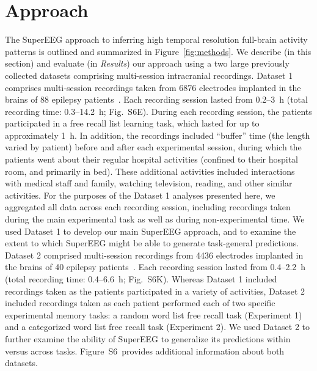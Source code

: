 \documentclass[11pt]{article}
\newcommand{\suppstats}{S6}
\begin{document}
\section*{Approach}
The SuperEEG approach to inferring high temporal resolution full-brain
activity patterns is outlined and summarized in
Figure~\ref{fig:methods}. We describe (in this section) and evaluate
(in \textit{Results}) our approach using a two large previously
collected datasets comprising multi-session intracranial recordings.
Dataset 1 comprises multi-session recordings taken from 6876
electrodes implanted in the brains of 88 epilepsy
patients~\citep{SedeEtal03, SedeEtal07a, SedeEtal07b, MannEtal11,
  MannEtal12}.  Each recording session lasted from 0.2--3~h (total
recording time: 0.3--14.2~h; Fig.~\suppstats E).  During each
recording session, the patients participated in a free recall list
learning task, which lasted for up to approximately 1~h.  In addition,
the recordings included ``buffer'' time (the length varied by patient)
before and after each experimental session, during which the patients
went about their regular hospital activities (confined to their
hospital room, and primarily in bed).  These additional activities
included interactions with medical staff and family, watching
television, reading, and other similar activities.  For the purposes
of the Dataset 1 analyses presented here, we aggregated all data
across each recording session, including recordings taken during the
main experimental task as well as during non-experimental time.  We
used Dataset 1 to develop our main SuperEEG approach, and to examine
the extent to which SuperEEG might be able to generate task-general
predictions.  Dataset 2 comprised multi-session recordings from 4436
electrodes implanted in the brains of 40 epilepsy
patients~\citep{EzzyEtal17, HoraEtal17, KragEtal17, KuceEtal17,
  LinEtal17, SoloEtal18, WeidEtal18, EzzyEtal18, KuceEtal18}.  Each
recording session lasted from 0.4--2.2~h (total recording time:
0.4--6.6~h; Fig.~\suppstats K).  Whereas Dataset 1 included recordings
taken as the patients participated in a variety of activities, Dataset
2 included recordings taken as each patient performed each of two
specific experimental memory tasks: a random word list free recall
task (Experiment 1) and a categorized word list free recall task
(Experiment 2).  We used Dataset 2
to further examine the ability of SuperEEG to generalize its
predictions within versus across tasks.  Figure~\suppstats~provides
additional information about both datasets.
\end{document}
